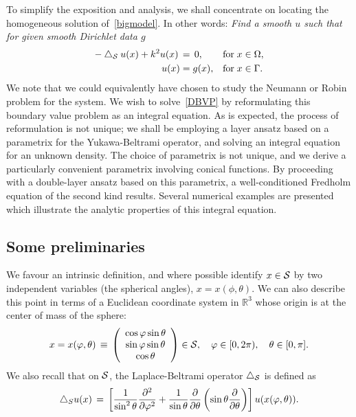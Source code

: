 To simplify the exposition and analysis, we shall concentrate on
locating the homogeneous solution of~\eqref{bigmodel}.  In other words:
{\it Find a smooth $u$ such that for given smooth Dirichlet data $g$}
\begin{subequations}
  \label{DBVP}
  \begin{align}
    -\lap_{\S} u(x) +k^2u(x)\, &= \, 0, &&\mbox{for} \; 
      x \in { \Omega},\\
    u(x) &= g(x), &&\mbox{for} \; x \in \Gamma.
  \end{align}
\end{subequations}
We note that we could equivalently have chosen to study the Neumann or
Robin problem for the system.  We wish to solve~\eqref{DBVP} by
reformulating this boundary value problem as an integral equation. As is
expected, the process of reformulation is not unique; we shall be
employing a layer ansatz based on a parametrix for the Yukawa-Beltrami
operator, and solving an integral equation for an unknown density.  The
choice of parametrix is not unique, and we derive a particularly
convenient parametrix involving conical functions. By proceeding with a
double-layer ansatz based on this parametrix, a well-conditioned
Fredholm equation of the second kind results. Several numerical examples
are presented which illustrate the analytic properties of this integral
equation.


\subsection{Some preliminaries}
 We favour an intrinsic definition, and where possible identify $x\in \S$ by two independent variables (the spherical angles), $x=x(\phi,\theta)$. We can also describe this point in terms of a Euclidean coordinate system in $\mathbb{R}^3$ whose origin is at the center of mass of the sphere: 
\begin{align*}
 x= x(\varphi,\theta) \, \equiv \, \left( 
  \begin{array}{c}
    \cos \varphi \sin \theta \\
    \sin \varphi \sin \theta \\
    \cos \theta
  \end{array} 
  \right) \in{\S}, \quad \varphi \in [0,2\pi), 
    \quad \theta \in [0,\pi].
\end{align*}
We also recall that on $\S$, the Laplace-Beltrami operator  $\lap_\S$
is defined as
\begin{align*}
  \lap_S u(x) \, = \, \left[
  \frac{1}{\sin^2 \theta} \frac{\partial^2}{\partial \varphi^2} +
  \frac{1}{\sin \theta} \frac{\partial}{\partial \theta}
  \left(\sin \theta \frac{\partial}{ \partial \theta}\right)
  \right] u(x(\varphi,\theta)).
\end{align*}

